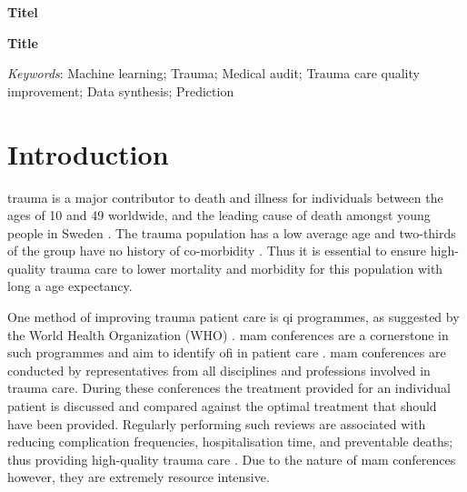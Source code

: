 \documentclass[12pt, letterpaper]{article}
\begin{document}
\begin{titlepage}
    
\end{titlepage}


\textbf{Titel}

\lipsum[1]

\vfill

\textbf{Title}

\lipsum[1]

\vfill

\textit{Keywords}: Machine learning; Trauma; Medical audit; Trauma care quality improvement; Data synthesis; Prediction

\newpage

\glsaddall
\printnoidxglossary[type=acronym,style=csuper]
\printnoidxglossary[style=gsuper]

\newpage
{}


\section{Introduction}
\Gls{trauma} is a major contributor to death and illness
for individuals between the ages of 10 and 49 worldwide, and the leading cause of death amongst young people in Sweden \cite{roth_global_2018, vos_global_2020, sos_death_2021}. The \gls{trauma} population has a low average age and two-thirds of the group have no history of co-morbidity \cite{brattstrom_socio-economic_2015}. Thus it is essential to ensure high-quality \gls{trauma} care to lower mortality and morbidity for this population with long a age expectancy.

One method of improving trauma patient care is \acrfull{qi} programmes, as suggested by the World Health Organization (WHO) \cite{world_health_organization_guidelines_2009}. \Acrfull{mam} conferences are a cornerstone in such programmes and aim to identify \acrfull{ofi} in patient care \cite{santana_development_2014}. \acrshort{mam} conferences are conducted by representatives from all disciplines and professions involved in trauma care. During these conferences the treatment provided for an individual patient is discussed and compared against the optimal treatment that should have been provided. Regularly performing such reviews are associated with reducing complication frequencies, hospitalisation time, and preventable deaths; thus providing high-quality trauma care \cite{stelfox_evidence_2011, mcdermott_trauma_1994}. Due to the nature of \acrshort{mam} conferences however, they are extremely resource intensive.
\end{document}
